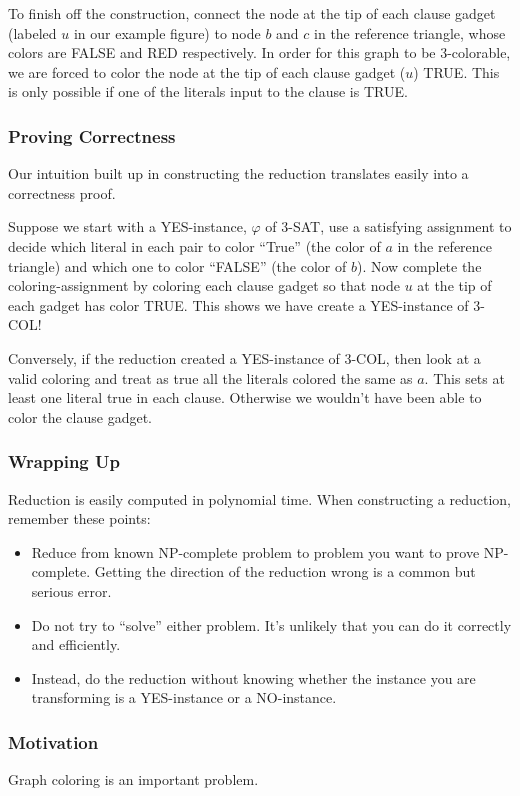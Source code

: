 To finish off the construction, connect the node at the tip of each clause gadget (labeled $u$ in our example figure) to node $b$ and $c$ in the reference triangle, whose colors are FALSE and RED respectively. In order for this graph to be 3-colorable, we are forced to color the node at the tip of each clause gadget ($u$) TRUE. This is only possible if one of the literals input to the clause is TRUE.

\subsubsection{Proving Correctness}
Our intuition built up in constructing the reduction translates easily into a correctness proof.

Suppose we  start with a YES-instance, $\varphi$ of 3-SAT, use a satisfying assignment to decide which literal in each pair to color ``True'' (the color of $a$ in the reference triangle) and which one to color ``FALSE'' (the color of $b$). Now complete the coloring-assignment by coloring each clause gadget so that node $u$ at the tip of each gadget has color TRUE. This shows we have create a YES-instance of 3-COL!

Conversely, if the reduction created a YES-instance of 3-COL, then look at a valid coloring and treat as true all the literals colored the same as $a$. This sets at least one literal true in each clause. Otherwise we wouldn't have been able to color the clause gadget.

\subsubsection{Wrapping Up}
Reduction is easily computed in polynomial time. When constructing a reduction, remember these points:
\begin{itemize}
	\item Reduce from known NP-complete problem to problem you want to prove NP-complete. Getting the direction of the reduction wrong is a common but serious error.
	\item Do not try to ``solve'' either problem. It's unlikely that you can do it correctly and efficiently.
	\item Instead, do the reduction without knowing whether the instance you are transforming is a YES-instance or a NO-instance.
\end{itemize}

\subsubsection{Motivation}
Graph coloring is an important problem.

